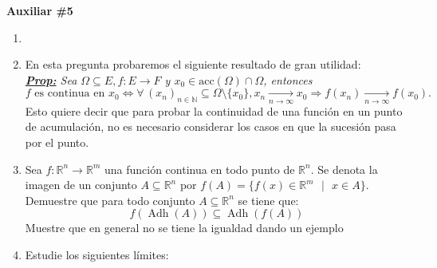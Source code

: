 \documentclass[letterpaper,11pt]{article}
\DeclareMathOperator{\adh}{Adh}
\let\lim=\undefined\DeclareMathOperator*{\lim}{\text{lím}}
\newcommand{\ssi}{\Longleftrightarrow}
\newcommand{\conv}[2]{\xrightarrow[#1\to#2]{}}
\newcommand{\imp}{\Longrightarrow}
\newcommand{\N}{\mathbb{N}}
\begin{document}
\begin{center}
	\LARGE \bf{Auxiliar \#5}\\
\end{center}

\vspace{-1cm}
\begin{enumerate}\setlength{\itemsep}{0.4cm}	
\item[]

\item En esta pregunta probaremos el siguiente resultado de gran utilidad:\\

\textit{\underline{\textbf{Prop:}} Sea $\Omega \subseteq E, f:E\to F$ y $x_0 \in \text{acc}(\Omega)\cap \Omega$, entonces
\[f \text{ es continua en } x_0 \ssi \forall\,(x_n)_{n\in\N}\subseteq\Omega\setminus\{x_0\}, x_n\conv{n}{\infty}x_0 \imp f(x_n)\conv{n}{\infty}f(x_0).\]
}
Esto quiere decir que para probar la continuidad de una función en un punto de acumulación, no es necesario considerar los casos en que la sucesión pasa por el punto.

\item Sea $f:\mathbb{R}^n\rightarrow\mathbb{R}^m$ una función continua en todo punto de $\mathbb{R}^n$. Se denota la imagen de un conjunto $A\subseteq\mathbb{R}^n$ por $f(A)=\{f(x)\in\mathbb{R}^m\text{ }|\text{ } x\in A\}$. Demuestre que para todo conjunto $A\subseteq\mathbb{R}^n$ se tiene que: 
\[f(\adh{(A)})\subseteq\adh{(f(A))}\]
Muestre que en general no se tiene la igualdad dando un ejemplo

\item Estudie los siguientes límites:
    \begin{enumerate}
        

\end{enumerate}
\end{enumerate}
\end{document}
